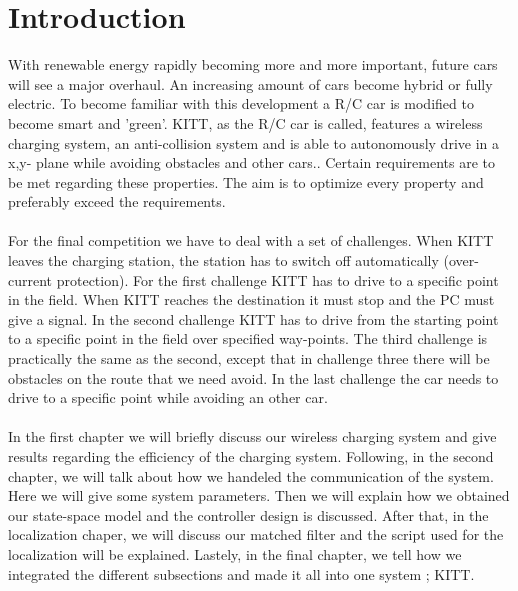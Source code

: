 \documentclass[final]{scrreprt} %
\begin{document}
\chapter{Introduction}
With renewable energy rapidly becoming more and more important, future cars will see a major overhaul. 
An increasing amount of cars become hybrid or fully electric. 
To become familiar with this development a R/C car is modified to become smart and 'green'.
KITT, as the R/C car is called, features a wireless charging system, an anti-collision system and is able to autonomously drive in a x,y- plane while avoiding obstacles and other cars.. 
Certain requirements are to be met regarding these properties. 
The aim is to optimize every property and preferably exceed the requirements.
\\\\
For the final competition we have to deal with a set of challenges. 
When KITT leaves the charging station, the station has to switch off automatically (over-current protection).
For the first challenge KITT has to drive to a specific point in the field. 
When KITT reaches the destination it must stop and the PC must give a signal. 
In the second challenge KITT has to drive from the starting point to a specific point in the field over specified way-points.
The third challenge is practically the same as the second, except that in challenge three there will be obstacles on the route that we need avoid.
In the last challenge the car needs to drive to a specific point while avoiding an other car. 
\\\\
In the first chapter we will briefly discuss our wireless charging system and give results regarding the efficiency of the charging system.
Following, in the second chapter, we will talk about how we handeled the communication of the system. 
Here we will give some system parameters. 
Then we will explain how we obtained our state-space model and the controller design is discussed. 
After that, in the localization chaper, we will discuss our matched filter and the script used for the localization will be explained. 
Lastely, in the final chapter, we tell how we integrated the different subsections and made it all into one system ; KITT.


\end{document}
